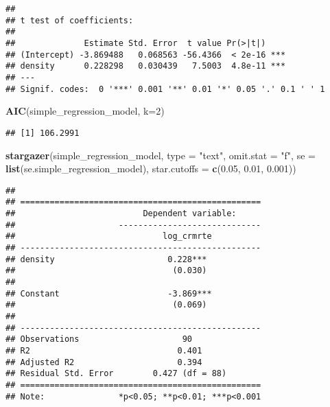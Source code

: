 \documentclass[
]{article}
\newenvironment{Shaded}{\begin{snugshade}}{\end{snugshade}}
\newcommand{\DataTypeTok}[1]{\textcolor[rgb]{0.13,0.29,0.53}{#1}}
\newcommand{\DecValTok}[1]{\textcolor[rgb]{0.00,0.00,0.81}{#1}}
\newcommand{\FloatTok}[1]{\textcolor[rgb]{0.00,0.00,0.81}{#1}}
\newcommand{\KeywordTok}[1]{\textcolor[rgb]{0.13,0.29,0.53}{\textbf{#1}}}
\newcommand{\NormalTok}[1]{#1}
\newcommand{\StringTok}[1]{\textcolor[rgb]{0.31,0.60,0.02}{#1}}
\begin{document}
\begin{verbatim}
## 
## t test of coefficients:
## 
##              Estimate Std. Error  t value Pr(>|t|)    
## (Intercept) -3.869488   0.068563 -56.4366  < 2e-16 ***
## density      0.228298   0.030439   7.5003  4.8e-11 ***
## ---
## Signif. codes:  0 '***' 0.001 '**' 0.01 '*' 0.05 '.' 0.1 ' ' 1
\end{verbatim}

\begin{Shaded}
\begin{Highlighting}[]
\KeywordTok{AIC}\NormalTok{(simple_regression_model, }\DataTypeTok{k=}\DecValTok{2}\NormalTok{)}
\end{Highlighting}
\end{Shaded}

\begin{verbatim}
## [1] 106.2991
\end{verbatim}

\begin{Shaded}
\begin{Highlighting}[]
\KeywordTok{stargazer}\NormalTok{(simple_regression_model,}
          \DataTypeTok{type =} \StringTok{"text"}\NormalTok{, }\DataTypeTok{omit.stat =} \StringTok{"f"}\NormalTok{,}
          \DataTypeTok{se =} \KeywordTok{list}\NormalTok{(se.simple_regression_model),}
          \DataTypeTok{star.cutoffs =} \KeywordTok{c}\NormalTok{(}\FloatTok{0.05}\NormalTok{, }\FloatTok{0.01}\NormalTok{, }\FloatTok{0.001}\NormalTok{))}
\end{Highlighting}
\end{Shaded}

\begin{verbatim}
## 
## =================================================
##                          Dependent variable:     
##                     -----------------------------
##                              log_crmrte          
## -------------------------------------------------
## density                       0.228***           
##                                (0.030)           
##                                                  
## Constant                      -3.869***          
##                                (0.069)           
##                                                  
## -------------------------------------------------
## Observations                     90              
## R2                              0.401            
## Adjusted R2                     0.394            
## Residual Std. Error        0.427 (df = 88)       
## =================================================
## Note:               *p<0.05; **p<0.01; ***p<0.001
\end{verbatim}
\end{document}
